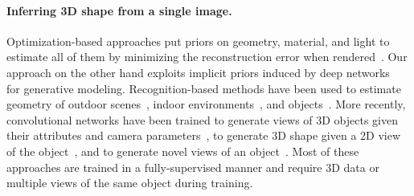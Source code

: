 \paragraph*{Inferring 3D shape from a single image.} Optimization-based
approaches put priors on geometry, material, and light to estimate
all of them by minimizing the reconstruction error when
rendered~\cite{land1971lightness,barrow1978recovering,BarronTPAMI2015}.
Our approach on the other hand exploits implicit priors induced by
deep networks~\cite{deepshapeprior,bayesiandip} for generative modeling.
Recognition-based methods have been used to estimate geometry of
outdoor scenes~\cite{hoiem2005geometric,saxena2005learning}, indoor
environments~\cite{eigen2015predicting,schwing2012efficient}, and
objects~\cite{andriluka2010monocular,savarese20073d}.
More recently, convolutional networks have been trained to generate
views of 3D objects given their attributes and camera
parameters~\cite{dosovitskiy2015learning}, to generate 3D shape given
a 2D view of the object~\cite{tatarchenko2016multi}, and to generate
novel views of an object~\cite{zhou2016view}. Most of these approaches
are trained in a fully-supervised manner and require 3D data or
multiple views of the same object during training.



